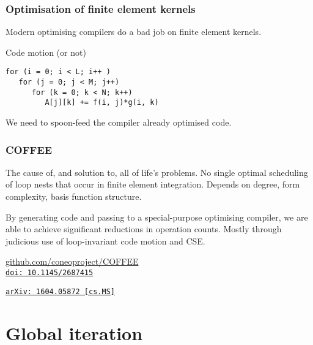 \documentclass[presentation]{beamer}
\newcommand{\arxivlink}[2]{%
  \href{http://www.arxiv.org/abs/#1}%
  {{\small\texttt{arXiv:\,#1\,[#2]}}}%
}
\newcommand{\doilink}[1]{%
  \href{http://dx.doi.org/#1}%
  {{\small\texttt{doi:\,#1}{}}}%
}
\begin{document}
\begin{frame}[fragile]
  \frametitle{Optimisation of finite element kernels}
  
  \begin{problem}
    Modern optimising compilers do a bad job on finite element
    kernels.
  \end{problem}
  \begin{exampleblock}{Code motion (or not)}
\begin{verbatim}
for (i = 0; i < L; i++ )
   for (j = 0; j < M; j++)
      for (k = 0; k < N; k++)
         A[j][k] += f(i, j)*g(i, k)
\end{verbatim}
  \end{exampleblock}
  \begin{corollary}
    We need to spoon-feed the compiler already optimised code.
  \end{corollary}
\end{frame}
\begin{frame}
  \frametitle{COFFEE}
  The cause of, and solution to, all of life's problems.
  No single optimal scheduling of loop nests that occur in finite
  element integration.  Depends on degree, form complexity, basis
  function structure.

  By generating code and passing to a special-purpose optimising
  compiler, we are able to achieve significant reductions in operation
  counts.  Mostly through judicious use of loop-invariant code motion
  and CSE.

  

  \begin{center}
    \url{github.com/coneoproject/COFFEE}\\
    \cite{Luporini:2015} \doilink{10.1145/2687415}
    \cite{Luporini:2016} \arxivlink{1604.05872}{cs.MS}\\
  \end{center}
\end{frame}
\section{Global iteration}
\end{document}
